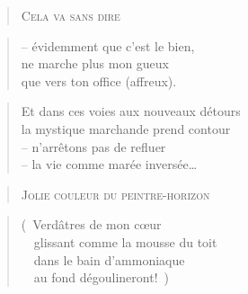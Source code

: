   \begin{verse}
    \textsc{Cela va sans dire}
  \end{verse}
  \begin{verse}
    -- évidemment que c’est le bien,\\
    ne marche plus mon gueux\\
    que vers ton office (affreux).
  \end{verse}
  \begin{verse}
    Et dans ces voies aux nouveaux détours\\
    la mystique marchande prend contour\\
    -- n’arrêtons pas de refluer\\
    -- la vie comme marée inversée…
  \end{verse}
  \begin{verse}
    \textsc{Jolie couleur du peintre-horizon}
  \end{verse}
  \begin{verse}
    (~Verdâtres de mon cœur\\
    ~~glissant comme la mousse du toit\\
    ~~dans le bain d’ammoniaque\\
    ~~au fond dégoulineront!~)
  \end{verse}

